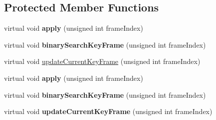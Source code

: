 \subsection*{Protected Member Functions}
\begin{DoxyCompactItemize}
\item 
\mbox{\label{classTimeline_a2ba4df0dc61901b56c4c33b6fc92bbab}} 
virtual void {\bfseries apply} (unsigned int frame\+Index)
\item 
\mbox{\label{classTimeline_a39a771d9eff3db5517cb9f4e420256a9}} 
virtual void {\bfseries binary\+Search\+Key\+Frame} (unsigned int frame\+Index)
\item 
virtual void \hyperlink{classTimeline_a82ef4c0ac02b4a066c688c38ed1ac7eb}{update\+Current\+Key\+Frame} (unsigned int frame\+Index)
\item 
\mbox{\label{classTimeline_a35903f35d7354d1ad786d0192e45f351}} 
virtual void {\bfseries apply} (unsigned int frame\+Index)
\item 
\mbox{\label{classTimeline_ac2021a212b5d0cb33cc769298ad231f1}} 
virtual void {\bfseries binary\+Search\+Key\+Frame} (unsigned int frame\+Index)
\item 
\mbox{\label{classTimeline_a6f37293419988ec01e406fe699aff3a6}} 
virtual void {\bfseries update\+Current\+Key\+Frame} (unsigned int frame\+Index)
\end{DoxyCompactItemize}
